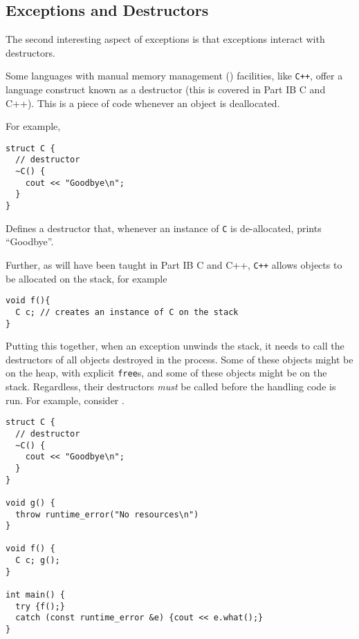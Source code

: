 \subsection{Exceptions and Destructors}
The second interesting aspect of exceptions is that exceptions interact with destructors. 

Some languages with manual memory management () facilities, like \texttt{C++}, offer a language construct known as a destructor (this is covered in \textsf{Part IB C and C++}). This is a piece of code whenever an object is deallocated.

For example, 
\begin{verbatim}
struct C {
  // destructor
  ~C() {
    cout << "Goodbye\n";
  }
}
\end{verbatim}
Defines a destructor that, whenever an instance of \texttt{C} is de-allocated, prints ``Goodbye''.

Further, as will have been taught in \textsf{Part IB C and C++}, \texttt{C++} allows objects to be allocated on the stack, for example

\begin{verbatim}
void f(){
  C c; // creates an instance of C on the stack
}
\end{verbatim}

Putting this together, when an exception unwinds the stack, it needs to call the destructors of all objects destroyed in the process. Some of these objects might be on the heap, with explicit \texttt{free}s, and some of these objects might be on the stack. Regardless, their destructors \textit{must} be called before the handling code is run. For example, consider .

\begin{code}
\label{code:c-destructor-example}
\begin{verbatim}
struct C {
  // destructor
  ~C() {
    cout << "Goodbye\n";
  }
}

void g() {
  throw runtime_error("No resources\n")
}

void f() {
  C c; g();
}

int main() {
  try {f();}
  catch (const runtime_error &e) {cout << e.what();}
}
\end{verbatim}
\end{code}

